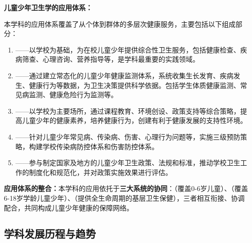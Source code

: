 \begin{defbox}
\textbf{儿童少年卫生学的应用体系：}

本学科的应用体系覆盖了从个体到群体的多层次健康服务，主要包括以下组成部分：

\begin{enumerate}[leftmargin=*]
    \item {}——以学校为基础，为在校儿童少年提供综合性卫生服务，包括健康检查、疾病筛查、心理咨询、营养指导等，是学科最重要的实践领域。

    \item {}——通过建立常态化的儿童少年健康监测体系，系统收集生长发育、疾病发生、健康行为等数据，为卫生决策提供科学依据。包括学生体质健康监测、常见病监测、健康危险行为监测等。

    \item {}——以学校为主要场所，通过课程教育、环境创设、政策支持等综合策略，提高儿童少年的健康素养，培养健康行为，创建有利于健康发展的支持性环境。

    \item {}——针对儿童少年常见病、传染病、伤害、心理行为问题等，实施三级预防策略，构建学校传染病防控体系和伤害防控体系。

    \item {}——参与制定国家及地方的儿童少年卫生政策、法规和标准，推动学校卫生工作的制度化和规范化，并对政策实施效果进行评估。
\end{enumerate}

\textbf{应用体系的整合：}本学科的应用依托于\textbf{三大系统的协同}：（覆盖0-6岁儿童）、（覆盖6-18岁学龄儿童少年）、（提供全生命周期的基层卫生保健），三者相互衔接、协调配合，共同构成儿童少年健康的保障网络。
\end{defbox}

\subsection{学科发展历程与趋势}

